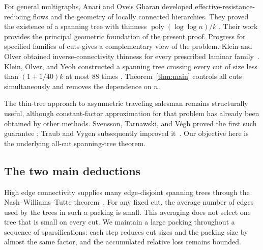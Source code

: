 For general multigraphs, Anari and Oveis Gharan developed
effective-resistance-reducing flows and the geometry of locally
connected hierarchies. They proved the existence of a spanning tree
with thinness \(\operatorname{poly}(\log\log n)/k\)
\cite[Corollary~1.8]{AOG}.
Their work provides the principal geometric foundation of the present
proof. Progress for specified families of cuts gives a complementary
view of the problem. Klein and Olver obtained inverse-connectivity
thinness for every prescribed laminar family~\cite{KleinOlver2023}.
Klein, Olver, and Yeoh constructed a spanning tree crossing every cut
of size less than \((1+1/40)k\) at most \(88\) times
\cite[Theorem~1]{KleinOlverYeoh}.
Theorem~\ref{thm:main} controls all cuts simultaneously and removes
the dependence on \(n\).

The thin-tree approach to asymmetric traveling salesman remains
structurally useful, although constant-factor approximation for that
problem has already been obtained by other methods. Svensson,
Tarnawski, and V\'egh proved the first such guarantee
\cite{SvenssonTarnawskiVegh2020}; Traub and Vygen subsequently
improved it~\cite{TraubVygen2022}. Our objective here is the
underlying all-cut spanning-tree theorem.

\subsection*{The two main deductions}

High edge connectivity supplies many edge-disjoint spanning trees
through the Nash--Williams--Tutte theorem~\cite{NashWilliams,Tutte}.
For any fixed cut, the average number of edges used by the trees in
such a packing is small. This averaging does not select one tree
that is small on every cut. We maintain a large packing throughout
a sequence of sparsifications: each step reduces cut sizes and the
packing size by almost the same factor, and the accumulated relative
loss remains bounded.

